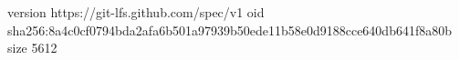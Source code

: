 version https://git-lfs.github.com/spec/v1
oid sha256:8a4c0cf0794bda2afa6b501a97939b50ede11b58e0d9188cce640db641f8a80b
size 5612

